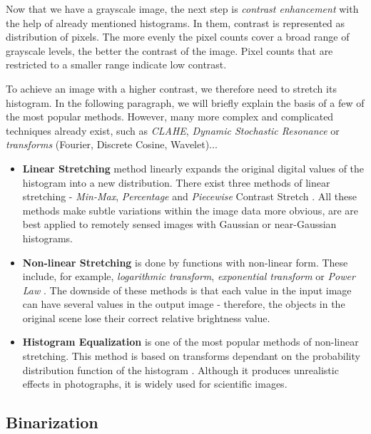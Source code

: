 Now that we have a grayscale image, the next step is \emph{contrast enhancement} with the help of already mentioned histograms. In them, contrast is represented as distribution of pixels. The more evenly the pixel counts cover a broad range of grayscale levels, the better the contrast of the image.  Pixel counts that are restricted to a smaller range indicate low contrast.

To achieve an image with a higher contrast, we therefore need to stretch its histogram. In the following paragraph, we will briefly explain the basis of a few of the most popular methods. However, many more complex and complicated techniques already exist, such as
\emph{CLAHE}, \emph{Dynamic Stochastic Resonance} or \emph{transforms} (Fourier, Discrete Cosine, Wavelet)... \citep{contrastOther}

\begin{itemize}

\item\textbf{Linear Stretching } method linearly expands the original digital values of the histogram into a new distribution. There exist three methods of linear stretching - \emph{Min-Max}, \emph{Percentage} and \emph{Piecewise} Contrast Stretch \citet{linearNonStretch}. All these methods make subtle variations within the image data more obvious, are are best applied to remotely sensed images with Gaussian or near-Gaussian histograms.

\item\textbf{Non-linear Stretching } is done by functions with non-linear form. These include, for example, \emph{logarithmic transform}, \emph{exponential transform} or \emph{Power Law} \citep{linearNonStretch}. The downside of these methods is that each value in the input image can have several values in the output image - therefore, the objects in the original scene lose their correct relative brightness value.

\item\textbf{Histogram Equalization} is one of the most popular methods of non-linear stretching. This method is based on transforms dependant on the probability distribution function of the histogram \citep{histogramEQ}. Although it produces unrealistic effects in photographs, it is widely used for scientific images.

\end{itemize}

\subsection{Binarization}

